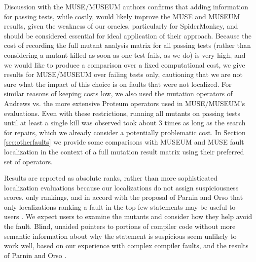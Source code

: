 Discussion with the MUSE/MUSEUM authors confirms  that adding information for passing tests, while costly, would likely improve the MUSE and MUSEUM results, given the weakness of our oracles, particularly for SpiderMonkey, and should be considered essential for ideal application of their approach.  Because the cost of recording the full mutant analysis matrix for all passing tests (rather than considering a mutant killed as soon as one test fails, as we do) is very high, and we would like to produce a comparison over a fixed computational cost, we give results for MUSE/MUSEUM over failing tests only, cautioning that we are not sure what the impact of this choice is on faults that were not localized.  For similar reasons of keeping costs low, we also used the mutation operators of Andrews vs. the more extensive Proteum \cite{Proteum} operators used in MUSE/MUSEUM's evaluations.  Even with these restrictions, running all mutants on passing tests until at least a single kill was observed took about 3 times as long as the search for repairs, which we already consider a potentially problematic cost.  In Section \ref{sec:otherfaults} we provide some comparisons with MUSEUM and MUSE fault localization in the context of a full mutation result matrix using their preferred set of operators.

Results are reported as absolute ranks, rather than more sophisticated \cite{MUSE} localization evaluations because our localizations do not assign suspiciousness scores, only rankings, and in accord with the proposal of Parnin and Orso that only localizations ranking a fault in the top few statements may be useful to users \cite{AutoHelp}.  We expect users to examine the mutants and consider how they help avoid the fault.  Blind, unaided pointers to portions of compiler code without more semantic information about why the statement is suspicious seem unlikely to work well, based on our experience with complex compiler faults, and the results of Parnin and Orso \cite{AutoHelp}.


  

